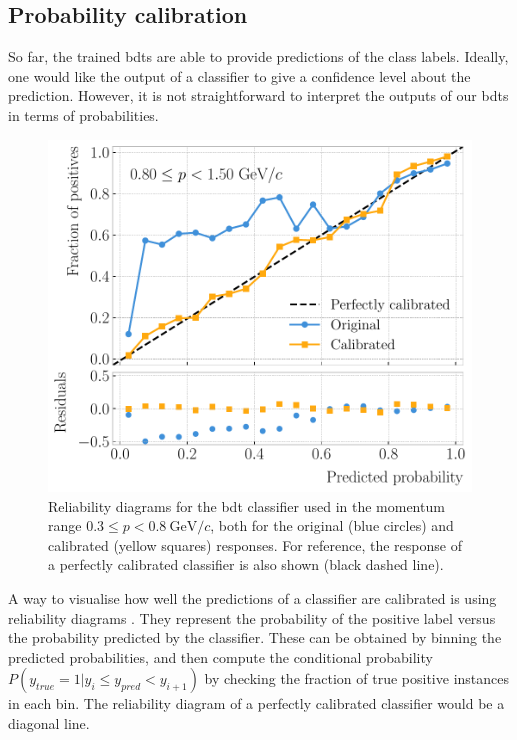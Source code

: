 \subsection{Probability calibration}

So far, the trained \gls{bdt}s are able to provide predictions of the class labels. Ideally, one would like the output of a classifier to give a confidence level about the prediction. However, it is not straightforward to interpret the outputs of our \gls{bdt}s in terms of probabilities.

\begin{figure}[t]
	\centering
	\includegraphics[width=.75\linewidth]{Images/GArSoft_PID/BDT/ecal_bdt_output_example_calibration_curves.pdf}
	\caption[Reliability diagrams for the \gls{bdt} classifier used in the momentum range $0.3 \leq p < 0.8 ~ \mathrm{GeV}/c$.]{Reliability diagrams for the \gls{bdt} classifier used in the momentum range $0.3 \leq p < 0.8 ~ \mathrm{GeV}/c$, both for the original (blue circles) and calibrated (yellow squares) responses. For reference, the response of a perfectly calibrated classifier is also shown (black dashed line).}
	\label{fig:bdt_calibration_curves}
\end{figure}

A way to visualise how well the predictions of a classifier are calibrated is using reliability diagrams \cite{Wilks1995}. They represent the probability of the positive label versus the probability predicted by the classifier. These can be obtained by binning the predicted probabilities, and then compute the conditional probability $P(y_{true}=1|y_{i} \leq y_{pred} < y_{i+1})$ by checking the fraction of true positive instances in each bin. The reliability diagram of a perfectly calibrated classifier would be a diagonal line.

